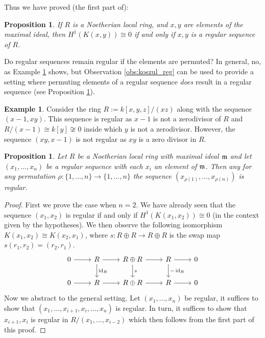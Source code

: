 \documentclass[12pt]{article}
\theoremstyle{plain}
\newtheorem{proposition}[thm]{Proposition}
\theoremstyle{definition}
\newtheorem{example}[thm]{Example}
\newcommand{\lto}{\longrightarrow}
\begin{document}
Thus we have proved (the first part of):
\begin{proposition}\label{prop:Zero_KozHom_reg}
If $R$ is a Noetherian local ring, and $x,y$ are elements of the maximal ideal, then $H^1(K(x,y)) \cong 0$ if and only if $x,y$ is a regular sequence of $R$.
\end{proposition}
Do regular sequences remain regular if the elements are permuted? In general, no, as Example \ref{ex:permute_reg} shows, but Observation \ref{obs:koszul_reg} can be used to provide a setting where permuting elements of a regular sequence \emph{does} result in a regular sequence (see Proposition \ref{prop:reg_permute}).
\begin{example}\label{ex:permute_reg}
Consider the ring $R := k[x,y,z]/(xz)$ along with the sequence $(x-1,xy)$. This sequence is regular as $x-1$ is not a zerodivisor of $R$ and $R/(x-1) \cong k[y] \not\cong 0$ inside which $y$ is not a zerodivisor. However, the sequence $(xy, x-1)$ is not regular as $xy$ is a zero divisor in $R$.
\end{example}
\begin{proposition}\label{prop:reg_permute}
Let $R$ be a Noetherian local ring with maximal ideal $\frak{m}$ and let $(x_1,...,x_n)$ be a regular sequence with each $x_i$ an element of $\frak{m}$. Then any for any permutation $\rho: \lbrace 1,...,n \rbrace \lto \lbrace 1,...,n \rbrace$ the sequence $(x_{\rho(1)},...,x_{\rho(n)})$ is regular.
\end{proposition}
\begin{proof}
First we prove the case when $n = 2$. We have already seen that the sequence $(x_1,x_2)$ is regular if and only if $H^1(K(x_1,x_2)) \cong 0$ (in the context given by the hypotheses). We then observe the following isomorphism $K(x_1,x_2) \cong K(x_2,x_1)$, where $s: R \oplus R \lto R \oplus R$ is the swap map $s(r_1,r_2) = (r_2,r_1)$.
\begin{equation}
    \begin{tikzcd}
    0\arrow[r] & R\arrow[r]\arrow[d,"{\operatorname{id}_R}"] & R \oplus R\arrow[r]\arrow[d,"s"] & R\arrow[r]\arrow[d,"{-\operatorname{id}_R}"] & 0\\
    0\arrow[r] & R\arrow[r] & R \oplus R\arrow[r] & R\arrow[r] & 0
    \end{tikzcd}
\end{equation}
Now we abstract to the general setting. Let $(x_1,...,x_n)$ be regular, it suffices to show that $(x_1,...,x_{i+1},x_i,..., x_n)$ is regular. In turn, it suffices to show that $x_{i+1},x_i$ is regular in $R/(x_1,...,x_{i-2})$ which then follows from the first part of this proof.
\end{proof}
\end{document}
